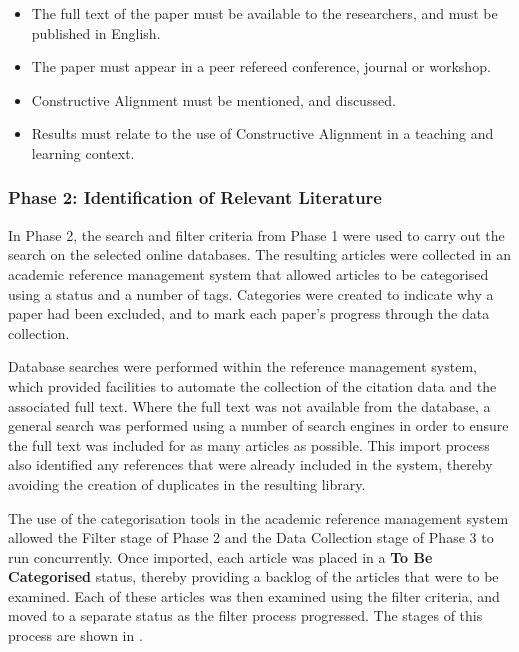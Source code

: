 \begin{itemize}[noitemsep,nolistsep]
	\item The full text of the paper must be available to the researchers, and must be published in English.
	\item The paper must appear in a peer refereed conference, journal or workshop.
	\item Constructive Alignment must be mentioned, and discussed.
	\item Results must relate to the use of Constructive Alignment in a teaching and learning context.
\end{itemize}


\subsubsection{Phase 2: Identification of Relevant Literature} %
\label{ssub:identification_of_relevant_literature}

In Phase 2, the search and filter criteria from Phase 1 were used to carry out the search on the selected online databases. The resulting articles were collected in an academic reference management system that allowed articles to be categorised using a status and a number of tags. Categories were created to indicate why a paper had been excluded, and to mark each paper's progress through the data collection. 

Database searches were performed within the reference management system, which provided facilities to automate the collection of the citation data and the associated full text. Where the full text was not available from the database, a general search was performed using a number of search engines in order to ensure the full text was included for as many articles as possible. This import process also identified any references that were already included in the system, thereby avoiding the creation of duplicates in the resulting library.

The use of the categorisation tools in the academic reference management system allowed the Filter stage of Phase 2 and the Data Collection stage of Phase 3 to run concurrently. Once imported, each article was placed in a \textbf{To Be Categorised} status, thereby providing a backlog of the articles that were to be examined. Each of these articles was then examined using the filter criteria, and moved to a separate status as the filter process progressed. The stages of this process are shown in .

